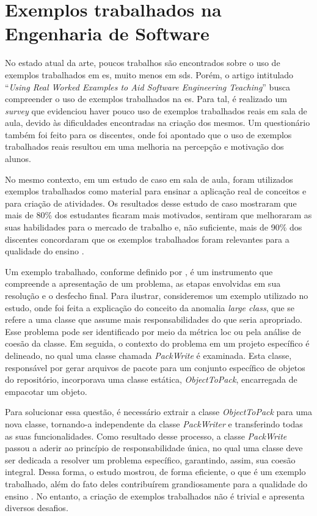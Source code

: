 \section{Exemplos trabalhados na Engenharia de Software}

No estado atual da arte, poucos trabalhos são encontrados sobre o uso de exemplos trabalhados em \gls{es}, muito menos em \gls{sds}. Porém, o artigo intitulado ``\textit{Using Real Worked Examples to Aid Software Engineering Teaching}'' \cite{Simone.Tonhao-etal:2021} busca compreender o uso de exemplos trabalhados na \gls{es}. Para tal, é realizado um \textit{survey} que evidenciou haver pouco uso de exemplos trabalhados reais em sala de aula, devido às dificuldades encontradas na criação dos mesmos. Um questionário também foi feito para os discentes, onde foi apontado que o uso de exemplos trabalhados reais resultou em uma melhoria na percepção e motivação dos alunos.

No mesmo contexto, em um estudo de caso em sala de aula, foram utilizados exemplos trabalhados como material para ensinar a aplicação real de conceitos e para criação de atividades. Os resultados desse estudo de caso mostraram que mais de 80\% dos estudantes ficaram mais motivados, sentiram que melhoraram as suas habilidades para o mercado de trabalho e, não suficiente, mais de 90\% dos discentes concordaram que os exemplos trabalhados foram relevantes para a qualidade do ensino \cite{Simone.Tonhao-etal:2021}.

Um exemplo trabalhado, conforme definido por , é um instrumento que compreende a apresentação de um problema, as etapas envolvidas em sua resolução e o desfecho final. Para ilustrar, consideremos um exemplo utilizado no estudo, onde foi feita a explicação do conceito da anomalia \textit{large class}, que se refere a uma classe que assume mais responsabilidades do que seria apropriado. Esse problema pode ser identificado por meio da métrica \gls{loc} ou pela análise de coesão da classe. Em seguida, o contexto do problema em um projeto específico é delineado, no qual uma classe chamada \textit{PackWrite} é examinada. Esta classe, responsável por gerar arquivos de pacote para um conjunto específico de objetos do repositório, incorporava uma classe estática, \textit{ObjectToPack}, encarregada de empacotar um objeto.

Para solucionar essa questão, é necessário extrair a classe \textit{ObjectToPack} para uma nova classe, tornando-a independente da classe \textit{PackWriter} e transferindo todas as suas funcionalidades. Como resultado desse processo, a classe \textit{PackWrite} passou a aderir ao princípio de responsabilidade única, no qual uma classe deve ser dedicada a resolver um problema específico, garantindo, assim, sua coesão integral. Dessa forma, o estudo mostrou, de forma eficiente, o que é um exemplo trabalhado, além do fato deles contribuírem grandiosamente para a qualidade do ensino \cite{Simone.Tonhao-etal:2021}. No entanto, a criação de exemplos trabalhados não é trivial e apresenta diversos desafios.

